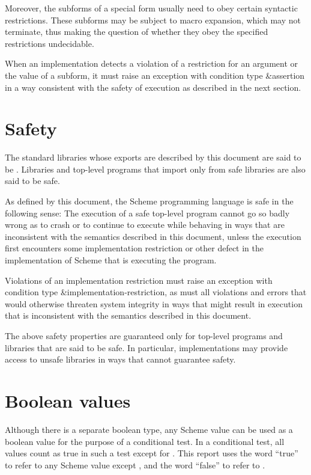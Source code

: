 Moreover, the subforms of a special form usually need to obey certain syntactic
restrictions.  These subforms may be subject to macro expansion, which
may not terminate, thus making the question of whether they obey the
specified restrictions undecidable.

When an implementation detects a violation of a restriction for an
argument or the value of a subform, it must raise an exception with
condition type {\cf\&assertion} in a way consistent with the safety of
execution as described in the next section.

\section{Safety}
\label{safeunsafemodesection}

The standard libraries whose exports are described by this document
are said to be .  Libraries and top-level
programs that import only from safe libraries are also said to be safe.

As defined by this document, the Scheme programming language
is safe in the following sense:
The execution of a safe top-level program
cannot go so badly wrong as to crash or to continue to
execute while behaving in ways that are
inconsistent with the semantics described in this document,
unless the execution first encounters some implementation
restriction or other defect in the implementation of Scheme
that is executing the program.

Violations of an implementation restriction must raise an
exception with condition type {\cf\&implementation-restriction},
as must all
violations and errors that would otherwise threaten system
integrity in ways that might result in execution that is
inconsistent with the semantics described in this document.

The above safety properties are guaranteed only for top-level programs
and libraries that are said to be safe.  In particular,
implementations may provide access to unsafe libraries in ways that
cannot guarantee safety.

\section{Boolean values}
\label{booleanvaluessection}

Although there is a separate boolean type, any Scheme value can be
used as a boolean value for the purpose of a conditional test.  In a
conditional test, all values count as true in such a test except for
\schfalse{}.  This report uses the word ``true'' to refer to any
Scheme value except \schfalse{}, and the word ``false'' to refer to
\schfalse{}.  

